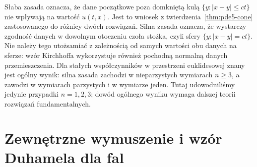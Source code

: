 \begin{uwaga}
Słaba zasada oznacza, że dane początkowe poza
domkniętą kulą $\{y:|x-y|\leq ct\}$ nie wpływają
na wartość $u(t,x)$. Jest to wniosek z
twierdzenia~\ref{thm:pde5-cone} zastosowanego
do różnicy dwóch rozwiązań. Silna zasada oznacza,
że wystarczy zgodność danych w dowolnym otoczeniu
czoła stożka, czyli sfery $\{y:|x-y|=ct\}$.
Nie należy tego utożsamiać z zależnością od
samych wartości obu danych na sferze: wzór
Kirchhoffa wykorzystuje również pochodną normalną
danych przemieszczenia.
Dla stałych współczynników w przestrzeni
euklidesowej znany jest ogólny wynik: silna zasada
zachodzi w nieparzystych wymiarach $n\geq3$,
a zawodzi w wymiarach parzystych i w wymiarze jeden.
Tutaj udowodniliśmy jedynie przypadki $n=1,2,3$;
dowód ogólnego wyniku wymaga dalszej teorii
rozwiązań fundamentalnych.
\end{uwaga}

\section{Zewnętrzne wymuszenie i wzór Duhamela dla fal}
\label{sec:pde5-forcing}

